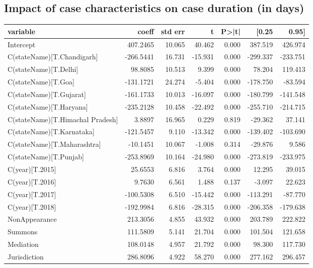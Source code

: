 \subsection{Impact of case characteristics on case duration (in days)}
\label{sec:impact-case-char}
{\footnotesize
 \begin{longtable}{@{}lrrrrrr@{}}
\label{tab:duration_reg}\\
\toprule
variable & coeff & std err & t & P>|t| & [0.25 & 0.95] \\\midrule
\endhead
Intercept & 407.2465 & 10.065 & 40.462 & 0.000 & 387.519 & 426.974 \\
C(stateName)[T.Chandigarh] & -266.5441 & 16.731 & -15.931 & 0.000 & -299.337 & -233.751 \\
C(stateName)[T.Delhi] & 98.8085 & 10.513 & 9.399 & 0.000 & 78.204 & 119.413 \\
C(stateName)[T.Goa] & -131.1721 & 24.274 & -5.404 & 0.000 & -178.750 & -83.594 \\
C(stateName)[T.Gujarat] & -161.1733 & 10.013 & -16.097 & 0.000 & -180.799 & -141.548 \\
C(stateName)[T.Haryana] & -235.2128 & 10.458 & -22.492 & 0.000 & -255.710 & -214.715 \\
C(stateName)[T.Himachal Pradesh] & 3.8897 & 16.965 & 0.229 & 0.819 & -29.362 & 37.141 \\
C(stateName)[T.Karnataka] & -121.5457 & 9.110 & -13.342 & 0.000 & -139.402 & -103.690 \\
C(stateName)[T.Maharashtra] & -10.1451 & 10.067 & -1.008 & 0.314 & -29.876 & 9.586 \\
C(stateName)[T.Punjab] & -253.8969 & 10.164 & -24.980 & 0.000 & -273.819 & -233.975 \\
C(year)[T.2015] & 25.6553 & 6.816 & 3.764 & 0.000 & 12.295 & 39.015 \\
C(year)[T.2016] & 9.7630 & 6.561 & 1.488 & 0.137 & -3.097 & 22.623 \\
C(year)[T.2017] & -100.5308 & 6.510 & -15.442 & 0.000 & -113.291 & -87.770 \\
C(year)[T.2018] & -192.9984 & 6.816 & -28.315 & 0.000 & -206.358 & -179.638 \\
NonAppearance & 213.3056 & 4.855 & 43.932 & 0.000 & 203.789 & 222.822 \\
Summons & 111.5809 & 5.141 & 21.704 & 0.000 & 101.504 & 121.658 \\
Mediation & 108.0148 & 4.957 & 21.792 & 0.000 & 98.300 & 117.730 \\
Jurisdiction & 286.8096 & 4.922 & 58.270 & 0.000 & 277.162 & 296.457 \\

\end{longtable}}
